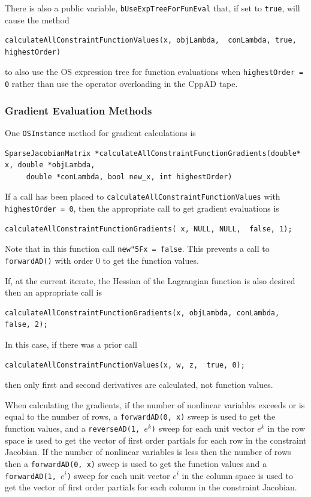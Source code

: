 \documentclass[11pt]{article}
\renewcommand{\_}{{\char"5F}}
\renewcommand{\{}{{\char"7B}}
\renewcommand{\}}{{\char"7D}}
\renewcommand{\^}{{\char"0D}}
\renewcommand{\'}{{\char"0D}}
\begin{document}
\begin{enumerate}[Step 1:]
There is also a public variable, {\tt bUseExpTreeForFunEval} that, if set to {\tt true}, will cause the method
\begin{verbatim}
calculateAllConstraintFunctionValues(x, objLambda,  conLambda, true, highestOrder)
\end{verbatim}
to also use the OS expression tree for function evaluations when {\tt highestOrder = 0} rather than use the operator overloading in the CppAD tape.

\subsubsection{Gradient Evaluation Methods}

One {\tt OSInstance} method for gradient calculations is
\begin{verbatim}
SparseJacobianMatrix *calculateAllConstraintFunctionGradients(double* x, double *objLambda,
     double *conLambda, bool new_x, int highestOrder)
\end{verbatim}
If a call has been placed to {\tt calculateAllConstraintFunctionValues} with {\tt highestOrder = 0}, then the appropriate call to get gradient evaluations is
\begin{verbatim}
calculateAllConstraintFunctionGradients( x, NULL, NULL,  false, 1);
\end{verbatim}
Note that in this function call {\tt new\_x = false}. This prevents a call to {\tt forwardAD()} with order 0 to get the function values.


If, at the current iterate, the Hessian of the Lagrangian function is also desired then an appropriate call is
\begin{verbatim}
calculateAllConstraintFunctionGradients(x, objLambda, conLambda, false, 2);
\end{verbatim}
In this case, if there was a prior call
\begin{verbatim}
calculateAllConstraintFunctionValues(x, w, z,  true, 0);
\end{verbatim}
then only first and second derivatives are calculated, not function values.

When calculating the gradients, if the number of nonlinear variables exceeds or is equal  to the number of rows,  a {\tt forwardAD(0, x)} sweep is used to get the function values,  and   a {\tt reverseAD(1, $e^{k}$)}  sweep for each unit vector  $e^{k}$ in the row space  is used to get the vector of first order partials for each row in the constraint Jacobian.  If the number of nonlinear variables is less then the number of rows then a {\tt forwardAD(0, x)} sweep  is used to get the function values and a {\tt forwardAD(1,  $e^{i}$)}  sweep for each unit vector  $e^{i}$ in the column space is used to get the vector of first order partials for each column in the constraint Jacobian.


\end{enumerate}
\end{document}
